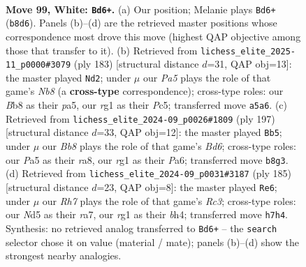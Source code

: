 \documentclass[11pt]{article}
\begin{document}
\clearpage

\begin{figure}[p]\centering
\begin{subfigure}{0.46\textwidth}\centering
\resizebox{\linewidth}{!}{%
\newchessgame
\chessboard[
  setfen={1B3k2/7R/1P6/P2N4/4B1b1/1K5p/8/6r1 w - - 3 99},
  showmover=false,
  pgfstyle=straightmove, color=movearrow, markmove={b8-d6}
]}
\caption{}
\end{subfigure}\hfill
\begin{subfigure}{0.46\textwidth}\centering
\resizebox{\linewidth}{!}{%
\newchessgame
\chessboard[
  setfen={8/2K3B1/p6R/Pbp5/8/8/4k3/1n6 b - - 62 92},
  showmover=false,
  pgfstyle=straightmove, color=movearrow, markmove={b1-d2}
]}
\caption{}
\end{subfigure}
\\[4pt]
\begin{subfigure}{0.46\textwidth}\centering
\resizebox{\linewidth}{!}{%
\newchessgame
\chessboard[
  setfen={R7/8/p4b2/3k4/p5K1/2Pb4/1P6/4r3 b - - 5 99},
  showmover=false,
  pgfstyle=straightmove, color=movearrow, markmove={d3-b5}
]}
\caption{}
\end{subfigure}\hfill
\begin{subfigure}{0.46\textwidth}\centering
\resizebox{\linewidth}{!}{%
\newchessgame
\chessboard[
  setfen={5k2/R7/2r5/2P4p/7B/3K1bP1/8/8 b - - 2 93},
  showmover=false,
  pgfstyle=straightmove, color=movearrow, markmove={c6-e6}
]}
\caption{}
\end{subfigure}
\caption{\textbf{Move 99, White: \texttt{Bd6+}.} (a) Our position; Melanie plays \texttt{Bd6+} (\texttt{b8d6}). Panels (b)--(d) are the retrieved master positions whose correspondence most drove this move (highest QAP objective among those that transfer to it). (b) Retrieved from \texttt{lichess\_elite\_2025-11\_p0000\#3079} (ply 183) [structural distance $d$=31, QAP obj=13]: the master played \texttt{Nd2}; under $\mu$ our \emph{Pa5} plays the role of that game's \emph{Nb8} (a \textbf{cross-type} correspondence); cross-type roles: our \emph{B}b8 as their \emph{p}a5, our \emph{r}g1 as their \emph{P}c5; transferred move \texttt{a5a6}. (c) Retrieved from \texttt{lichess\_elite\_2024-09\_p0026\#1809} (ply 197) [structural distance $d$=33, QAP obj=12]: the master played \texttt{Bb5}; under $\mu$ our \emph{Bb8} plays the role of that game's \emph{Bd6}; cross-type roles: our \emph{P}a5 as their \emph{r}a8, our \emph{r}g1 as their \emph{P}a6; transferred move \texttt{b8g3}. (d) Retrieved from \texttt{lichess\_elite\_2024-09\_p0031\#3187} (ply 185) [structural distance $d$=23, QAP obj=8]: the master played \texttt{Re6}; under $\mu$ our \emph{Rh7} plays the role of that game's \emph{Rc3}; cross-type roles: our \emph{N}d5 as their \emph{r}a7, our \emph{r}g1 as their \emph{b}h4; transferred move \texttt{h7h4}. Synthesis: no retrieved analog transferred to \texttt{Bd6+} -- the \texttt{search} selector chose it on value (material / mate); panels (b)--(d) show the strongest nearby analogies.}
\label{fig:thought-m196}
\end{figure}
\end{document}
